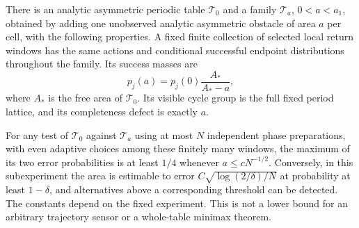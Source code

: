 \begin{theorem}\label{thm:area-testing}
There is an analytic asymmetric periodic table $\mathcal T_0$ and a
family $\mathcal T_a$, $0<a<a_1$, obtained by adding one unobserved
analytic asymmetric obstacle of area $a$ per cell, with the following
properties. A fixed finite collection of selected local return windows
has the same actions and conditional successful endpoint distributions
throughout the family. Its success masses are
\begin{equation}\label{eq:mass-tilt}
                p_j(a)=p_j(0)\frac{A_*}{A_*-a},
\end{equation}
where $A_*$ is the free area of $\mathcal T_0$. Its visible cycle group
is the full fixed period lattice, and its completeness defect is exactly $a$.

For any test of $\mathcal T_0$ against $\mathcal T_a$ using at most
$N$ independent phase preparations, with even adaptive choices among
these finitely many windows, the maximum of its two error probabilities
is at least $1/4$ whenever $a\le cN^{-1/2}$. Conversely, in this
subexperiment the area is estimable to error
$C\sqrt{\log(2/\delta)/N}$ at probability at least $1-\delta$,
and alternatives above a corresponding threshold can be detected.
The constants depend on the fixed experiment. This is not a lower bound
for an arbitrary trajectory sensor or a whole-table minimax theorem.
\end{theorem}

